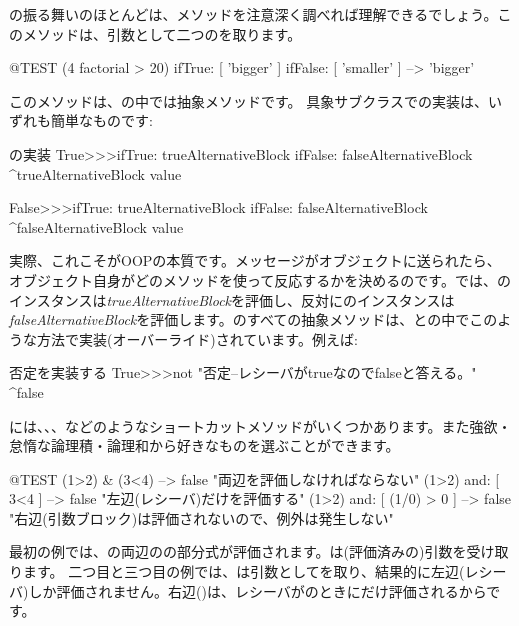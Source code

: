 \documentclass[a4paper,10pt,twoside]{book}
\begin{document}
の振る舞いのほとんどは、メソッドを注意深く調べれば理解できるでしょう。このメソッドは、引数として二つのを取ります。

\begin{code}{@TEST}
(4 factorial > 20) ifTrue: [ 'bigger' ] ifFalse: [ 'smaller' ] --> 'bigger'
\end{code}

このメソッドは、の中では抽象メソッドです。
具象サブクラスでの実装は、いずれも簡単なものです:

\begin{method}{の実装}
True>>>ifTrue: trueAlternativeBlock ifFalse: falseAlternativeBlock 
    ^trueAlternativeBlock value

False>>>ifTrue: trueAlternativeBlock ifFalse: falseAlternativeBlock 
    ^falseAlternativeBlock value
\end{method}

実際、これこそがOOPの本質です。メッセージがオブジェクトに送られたら、オブジェクト自身がどのメソッドを使って反応するかを決めるのです。では、のインスタンスは\emph{trueAlternativeBlock}を評価し、反対にのインスタンスは\emph{falseAlternativeBlock}を評価します。のすべての抽象メソッドは、との中でこのような方法で実装(オーバーライド)されています。例えば:

\begin{method}{否定を実装する}
True>>>not
    "否定--レシーバがtrueなのでfalseと答える。"
    ^false
\end{method}

には、、、などのようなショートカットメソッドがいくつかあります。また強欲・怠惰な論理積・論理和から好きなものを選ぶことができます。

\begin{code}{@TEST}
(1>2) & (3<4)              --> false    "両辺を評価しなければならない"
(1>2) and: [ 3<4 ]        --> false    "左辺(レシーバ)だけを評価する"
(1>2) and: [ (1/0) > 0 ] --> false    "右辺(引数ブロック)は評価されないので、例外は発生しない"
\end{code}

最初の例では、の両辺のの部分式が評価されます。\ct{&}は(評価済みの)引数を受け取ります。
二つ目と三つ目の例では、は引数としてを取り、結果的に左辺(レシーバ)しか評価されません。右辺()は、レシーバがのときにだけ評価されるからです。
\end{document}
